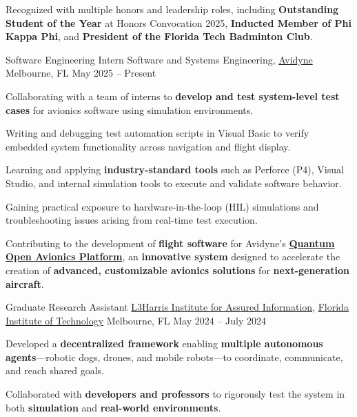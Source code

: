 \begin{cventries}
{\begin{cvitems}
\item Recognized with multiple honors and leadership roles, including \textbf{Outstanding Student of the Year} at Honors Convocation 2025, \textbf{Inducted Member of Phi Kappa Phi}, and \textbf{President of the Florida Tech Badminton Club}.
\end{cvitems}
}
\cventry
{Software Engineering Intern}
{Software and Systems Engineering, \href{https://www.avidyne.com/}{Avidyne}}
{Melbourne, FL}
{May 2025 – Present}
{
\begin{cvitems}
  \item Collaborating with a team of interns to \textbf{develop and test system-level test cases} for avionics software using simulation environments.
  \item Writing and debugging test automation scripts in Visual Basic to verify embedded system functionality across navigation and flight display.
  \item Learning and applying \textbf{industry-standard tools} such as Perforce (P4), Visual Studio, and internal simulation tools to execute and validate software behavior.
  \item Gaining practical exposure to hardware-in-the-loop (HIL) simulations and troubleshooting issues arising from real-time test execution.
  \item Contributing to the development of \textbf{flight software} for Avidyne’s \href{https://quantum.avidyne.com/}{\textbf{Quantum Open Avionics Platform}}, an \textbf{innovative system} designed to accelerate the creation of \textbf{advanced, customizable avionics solutions} for \textbf{next-generation aircraft}.
\end{cvitems}
}
\cventry
{Graduate Research Assistant}
{\href{https://research.fit.edu/l3hiai/}{L3Harris Institute for Assured Information}, \href{www.fit.edu}{Florida Institute of Technology}}
{Melbourne, FL}
{May 2024 – July 2024}
{
\begin{cvitems}
\item Developed a \textbf{decentralized framework} enabling \textbf{multiple autonomous agents}—robotic dogs, drones, and mobile robots—to coordinate, communicate, and reach shared goals.
\item Collaborated with \textbf{developers and professors} to rigorously test the system in both \textbf{simulation} and \textbf{real-world environments}.
\end{cvitems}
}


\end{cventries}
